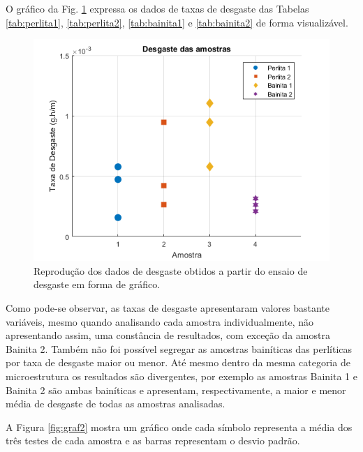 \documentclass[
12pt,
openany, %
oneside, %
a4paper,			
english,			
brazil			        %
]{abntbibufjf}
\begin{document}
	O gráfico da Fig. \ref{fig:graf1} expressa os dados de taxas de desgaste das Tabelas \ref{tab:perlita1}, \ref{tab:perlita2}, \ref{tab:bainita1} e \ref{tab:bainita2} de forma visualizável.
	\begin{figure}[H]
		\centering
		\includegraphics[width=1\textwidth]{graf1}
		\caption{Reprodução dos dados de desgaste obtidos a partir do ensaio de desgaste em forma de gráfico.}
		\label{fig:graf1}
	\end{figure}

	Como pode-se observar, as taxas de desgaste apresentaram valores bastante variáveis, mesmo quando analisando cada amostra individualmente, não apresentando assim, uma constância de resultados, com exceção da amostra Bainita 2. Também não foi possível segregar as amostras bainíticas das perlíticas por taxa de desgaste maior ou menor. Até mesmo dentro da mesma categoria de microestrutura os resultados são divergentes, por exemplo as amostras Bainita 1 e Bainita 2 são ambas bainíticas e apresentam, respectivamente, a maior e menor média de desgaste de todas as amostras analisadas.
	
	A Figura \ref{fig:graf2} mostra um gráfico onde cada símbolo representa a média dos três testes de cada amostra e as barras representam o desvio padrão.
\end{document}
